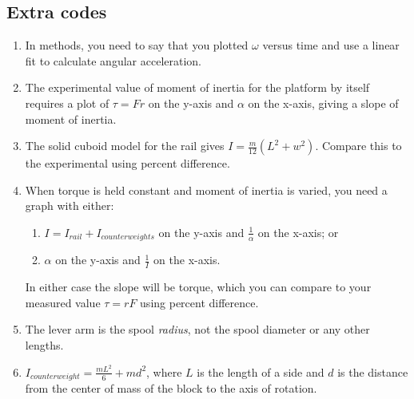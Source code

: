 \documentclass[12pt,letterpaper]{article}
\begin{document}
\begin{multicols}{2}
\section*{Extra codes}

\begin{enumerate}[start=200]
  \item In methods, you need to say that you plotted $\omega$ versus time
    and use a linear fit to calculate angular acceleration.
  \item The experimental value of moment of inertia for the platform by itself
    requires a plot of $\tau = F r$ on the y-axis and $\alpha$ on the x-axis,
    giving a slope of moment of inertia.
  \item The solid cuboid model for the rail gives $I = \frac{m}{12} (L^2+w^2)$.
    Compare this to the experimental using percent difference.
  \item When torque is held constant and moment of inertia is varied,
    you need a graph with either:
    \begin{enumerate}
      \item $I = I_{rail} + I_{counterweights}$ on the y-axis
        and $\frac{1}{\alpha}$ on the x-axis; or
      \item $\alpha$ on the y-axis and $\frac{1}{I}$ on the x-axis.
    \end{enumerate}
    In either case the slope will be torque,
    which you can compare to your measured value $\tau = r F$
    using percent difference.
  \item The lever arm is the spool \emph{radius},
    not the spool diameter or any other lengths.
  \item $I_{counterweight} = \frac{m L^2}{6} + m d^2$,
    where $L$ is the length of a side
    and $d$ is the distance from the center of mass of the block
    to the axis of rotation.
\end{enumerate}

\end{multicols}
\end{document}
